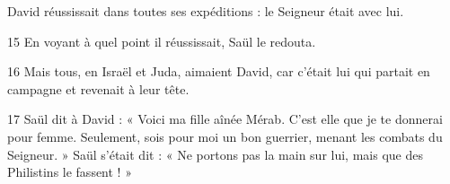 
David réussissait dans toutes ses expéditions : le Seigneur était avec lui.

15 En voyant à quel point il réussissait, Saül le redouta.

16 Mais tous, en Israël et Juda, aimaient David, car c’était lui qui partait en campagne et revenait à leur tête.

17 Saül dit à David : « Voici ma fille aînée Mérab. C’est elle que je te donnerai pour femme. Seulement, sois pour moi un bon guerrier, menant les combats du Seigneur. » Saül s’était dit : « Ne portons pas la main sur lui, mais que des Philistins le fassent ! »